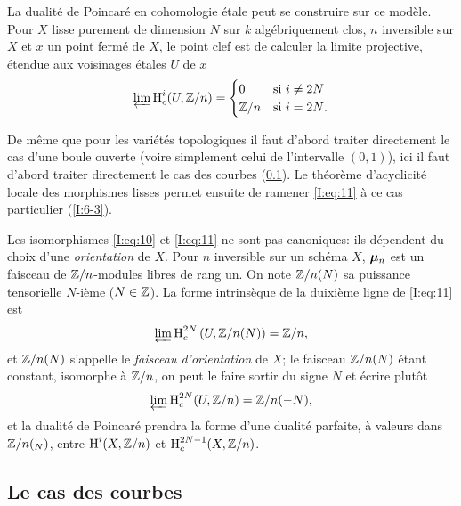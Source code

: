 \documentclass[oneside]{book}
\begin{document}
La dualité de Poincaré en cohomologie étale peut se construire sur ce 
modèle. Pour $X$ lisse purement de dimension $N$ sur $k$ algébriquement clos, 
$n$ inversible sur $X$ et $x$ un point fermé de $X$, le point clef est de 
calculer la limite projective, étendue aux voisinages étales $U$ de $x$ 
\begin{equation}\label{I:eq:11}
  \varprojlim \operatorname{H}_c^i(U,\mathbb{Z}/n) 
    = \begin{cases}
        0     & \text{si $i\ne 2N$} \\
        \mathbb{Z}/n & \text{si $i=2N$.}
      \end{cases} 
\end{equation}

De même que pour les variétés topologiques il faut d'abord traiter 
directement le cas d'une boule ouverte (voire simplement celui de l'intervalle 
$(0,1)$), ici il faut d'abord traiter directement le cas des courbes 
(\ref{I:6-2}). Le théorème d'acyclicité locale des morphismes lisses 
permet ensuite de ramener \eqref{I:eq:11} à ce cas particulier (\ref{I:6-3}). 

Les isomorphismes \eqref{I:eq:10} et \eqref{I:eq:11} ne sont pas canoniques: 
ils dépendent du choix d'une \emph{orientation} de $X$. Pour $n$ inversible 
sur un schéma $X$, ${\bm\mu}_n$ est un faisceau de $\mathbb{Z}/n$-modules libres de rang 
un. On note $\mathbb{Z}/n(N)$ sa puissance tensorielle $N$-ième ($N\in\mathbb{Z}$). La 
forme intrinsèque de la duixième ligne de \eqref{I:eq:11} est 
\begin{equation}\label{I:eq:12}
  \varprojlim \operatorname{H}_c^{2N} \left(U,\mathbb{Z}/n(N)\right) = \mathbb{Z}/n \text{,}
\end{equation}
et $\mathbb{Z}/n(N)$ s'appelle le \emph{faisceau d'orientation} de $X$; le faisceau 
$\mathbb{Z}/n(N)$ étant constant, isomorphe à $\mathbb{Z}/n$, on peut le faire sortir 
du signe $N$ et écrire plutôt
\begin{equation}\label{I:eq:13}
  \varprojlim \operatorname{H}_c^{2N} (U,\mathbb{Z}/n) = \mathbb{Z}/n(-N) \text{,}
\end{equation}
et la dualité de Poincaré prendra la forme d'une dualité parfaite, à 
valeurs dans $\mathbb{Z}/n(_N)$, entre $\operatorname{H}^i(X,\mathbb{Z}/n)$ et $\operatorname{H}_c^{2N-1}(X,\mathbb{Z}/n)$. 










\subsection{Le cas des courbes}\label{I:6-2}
\end{document}
